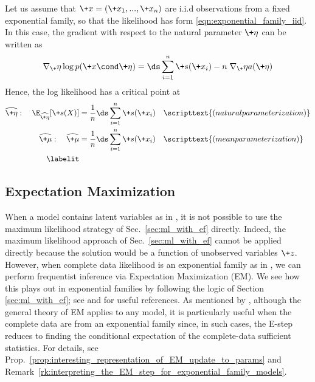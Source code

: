 \documentclass{article} %
\newcommand{\obs}{\+x}
\newcommand{\obsCaps}{X}
\newcommand{\logNormalizerFunction}{a}
\newcommand{\sufficientStatsFunction}{\+s}
\newcommand{\meanParam}{\+\mu}
\newcommand{\naturalParam}{\+\eta}
\begin{document}
Let us assume that $\+x=(\obs_1, ..., \obs_n)$ are i.i.d observations  from a fixed exponential family, so that the likelihood has form \eqref{eqn:exponential_family_iid}. In this case, the gradient with respect to the natural parameter $\naturalParam$ can be written as
%
\[ \nabla_\naturalParam \log p(\obs \cond \naturalParam) = \ds\sum_{i=1}^n \sufficientStatsFunction(\obs_i) - n \; \nabla_\naturalParam \logNormalizerFunction(\naturalParam) \]
%
Hence, the log likelihood has a critical point at  
%
\begin{align*}
\widehat{\naturalParam} : \quad   \E_{\widehat{\naturalParam}}[\sufficientStatsFunction(\obsCaps)] &= \frac{1}{n} \ds\sum_{i=1}^n \sufficientStatsFunction(\obs_i) && \scripttext{(natural parameterization)} \\
\widehat{\meanParam} : \quad \widehat{\meanParam}&= \frac{1}{n} \ds\sum_{i=1}^n \sufficientStatsFunction(\obs_i) && \scripttext{(mean parameterization)} \\
\labelit \label{eqn:condition_for_critical_point_of_EF_likelihood_under_iid_observations}
\end{align*}
% 
\subsection{Expectation Maximization}

When a model contains latent variables as in , it is not possible to use the maximum likelihood strategy of Sec.~\ref{sec:ml_with_ef} directly. Indeed, the maximum likelihood approach of Sec.~\ref{sec:ml_with_ef} cannot be applied directly because the solution would be a function of unobserved variables $\+z$.  However, when complete data likelihood is an exponential family as in , we can perform frequentist inference via Expectation Maximization (EM).  We see how this plays out in exponential families by following the logic of Section \ref{sec:ml_with_ef}; see \citet[Sec.~3]{salakhutdinov2002relationship} and \citet{miller2011why} for useful references.    As mentioned by \citet{meng1993maximum}, although the general theory of EM applies to any model, it is particularly useful when the complete data are from an exponential family since, in such cases, the E-step reduces to finding the conditional expectation of the complete-data sufficient statistics. For details, see Prop.~\ref{prop:interesting_representation_of_EM_update_to_params} and Remark~\ref{rk:interpreting_the_EM_step_for_exponential_family_models}.
\end{document}
